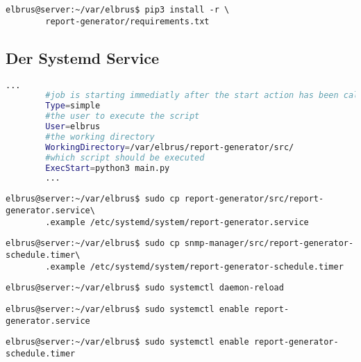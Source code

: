 \documentclass{article}
\begin{document}
	\lstset{style=commands}
	\begin{lstlisting}[caption={Installieren von fehlenden python3 Packages.}]
		elbrus@server:~/var/elbrus$ pip3 install -r \
		report-generator/requirements.txt
	\end{lstlisting}

	\newpage
	\subsection[systemd service]{Der Systemd Service}
	\lstset{style=files}
	\begin{lstlisting}[caption={snmp-manager.service.example - Die Variable 'WorkingDirectory' sowie die Variable 'User' anpassen.},language=bash ,keywords={WorkingDirectory, User}, keywordstyle=\color{red}, firstnumber=5]
		...
		#job is starting immediatly after the start action has been called
		Type=simple
		#the user to execute the script
		User=elbrus
		#the working directory
		WorkingDirectory=/var/elbrus/report-generator/src/
		#which script should be executed
		ExecStart=python3 main.py
		...
	\end{lstlisting}
	\lstset{style=commands}
	\begin{lstlisting}[caption={Kopieren des Serviceprogrammes.}]
		elbrus@server:~/var/elbrus$ sudo cp report-generator/src/report-generator.service\
		.example /etc/systemd/system/report-generator.service
	\end{lstlisting}
	
	\begin{lstlisting}[caption={Kopieren des Zeitplanungsprogrammes.}]
		elbrus@server:~/var/elbrus$ sudo cp snmp-manager/src/report-generator-schedule.timer\
		.example /etc/systemd/system/report-generator-schedule.timer
	\end{lstlisting}
	
	\begin{lstlisting}[caption={Neuladen des 'systemctl' Deamons.}]
		elbrus@server:~/var/elbrus$ sudo systemctl daemon-reload
	\end{lstlisting}
	
	\begin{lstlisting}[caption={Aktivieren des Serviceprogrammes.}]
		elbrus@server:~/var/elbrus$ sudo systemctl enable report-generator.service
	\end{lstlisting}
	
	\begin{lstlisting}[caption={Aktivieren des Zeitplanungsprogrammes.}]
		elbrus@server:~/var/elbrus$ sudo systemctl enable report-generator-schedule.timer
	\end{lstlisting}
	
\end{document}
